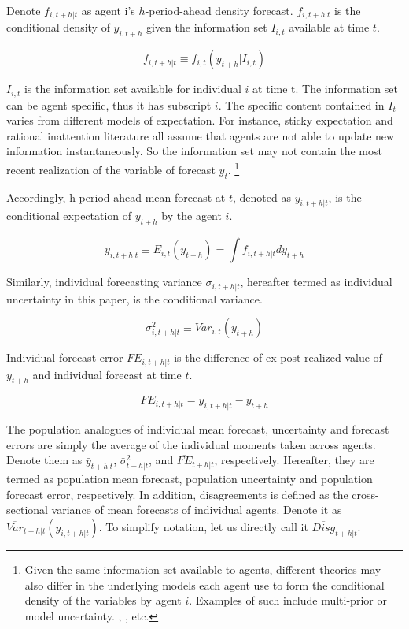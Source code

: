 \documentclass[]{article}
\begin{document}
	Denote $ f_{i,t+h|t}$ as agent i's $h$-period-ahead density forecast. $ f_{i,t+h|t}$ is the conditional density of $y_{i,t+h}$ given the information set $I_{i,t}$ available at time $t$. 
	
	$$f_{i,t+h|t} \equiv f_{i,t}(y_{t+h}|I_{i,t})$$
	
	
	$I_{i,t}$ is the information set available for individual $i$ at time t. The information set can be  agent specific, thus it has subscript $i$.  The specific content contained in $I_t$ varies from different models of expectation. For instance, sticky expectation and rational inattention literature all assume that agents are not able to update new information instantaneously. So the information set may not contain the most recent realization of the variable of forecast $y_t$. \footnote{Given the same information set available to agents, different theories may also differ in the underlying models each agent use to form the conditional density of the variables by agent $i$. Examples of such include multi-prior or model uncertainty. \citet{hansen2001robust}, \citet{hansen2008robustness}, etc.}
	
	Accordingly, h-period ahead mean forecast at $t$, denoted as $ y_{i,t+h|t}$, is the conditional expectation of $y_{t+h}$ by the agent $i$. 
	
	$$y_{i,t+h|t} \equiv E_{i,t}(y_{t+h}) =\int f_{i, t+h|t} d y_{t+h}$$
	
	Similarly, individual forecasting variance $\sigma_{i,t+h|t}$, hereafter termed as individual uncertainty in this paper, is the conditional variance.
	
	$$\sigma^2_{i,t+h|t} \equiv Var_{i,t}( y_{t+h} )$$
	
	Individual forecast error $FE_{i,t+h|t}$ is the difference of ex post realized value of $y_{t+h}$ and individual forecast at time $t$. 
	
	$$FE_{i,t+h|t} = y_{i,t+h|t} - y_{t+h}$$
	
	The population analogues of individual mean forecast, uncertainty and forecast errors are simply the average of the individual moments taken across agents. Denote them as $\bar y_{t+h|t}$, $\bar \sigma^2_{t+h|t}$, and $\overline{FE}_{t+h|t}$, respectively. Hereafter, they are termed as population mean forecast, population uncertainty and population forecast error, respectively. In addition, disagreements is defined as the cross-sectional variance of mean forecasts of individual agents.  Denote it as $\overline{Var}_{t+h|t}(y_{i,t+h|t}) $. To simplify notation, let us directly call it $\overline{Disg}_{t+h|t}$.  
	
\end{document}
